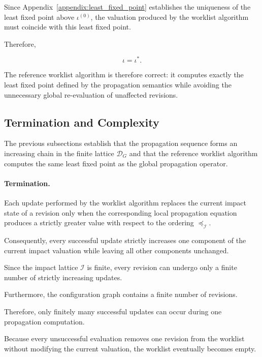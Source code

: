 \documentclass[10pt]{article}
\begin{document}
	Since Appendix~\ref{appendix:least_fixed_point}
	establishes the uniqueness of the least fixed point above
	$\iota^{(0)}$,
	the valuation produced by the worklist algorithm must coincide with this least
	fixed point.
	
	Therefore,
	
	\begin{equation}
		\label{eq:worklist_correctness}
		\iota
		=
		\iota^{*}.
	\end{equation}
	
	The reference worklist algorithm is therefore correct: it computes exactly the
	least fixed point defined by the propagation semantics while avoiding the
	unnecessary global re-evaluation of unaffected revisions.
	
	\subsection{Termination and Complexity}
	
	The previous subsections establish that the propagation sequence forms an
	increasing chain in the finite lattice
	$\mathcal D_G$
	and that the reference worklist algorithm computes the same least fixed point
	as the global propagation operator.
	
	\paragraph{Termination.}
	
	Each update performed by the worklist algorithm replaces the current impact
	state of a revision only when the corresponding local propagation equation
	produces a strictly greater value with respect to the ordering
	$\preceq_{\mathcal I}$.
	
	Consequently, every successful update strictly increases one component of the
	current impact valuation while leaving all other components unchanged.
	
	Since the impact lattice
	$\mathcal I$
	is finite, every revision can undergo only a finite number of strictly
	increasing updates.
	
	Furthermore, the configuration graph contains a finite number of revisions.
	
	Therefore, only finitely many successful updates can occur during one
	propagation computation.
	
	Because every unsuccessful evaluation removes one revision from the worklist
	without modifying the current valuation, the worklist eventually becomes empty.
	
\end{document}
